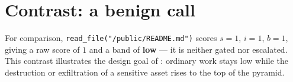 \section*{Contrast: a benign call}

For comparison, \texttt{read\_file("/public/README.md")} scores $s=1$, $i=1$,
$b=1$, giving a raw score of $1$ and a band of \textbf{low} --- it is neither
gated nor escalated. This contrast illustrates the design goal of
: ordinary work stays low while the destruction or
exfiltration of a sensitive asset rises to the top of the pyramid.
